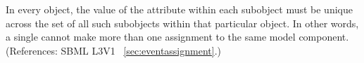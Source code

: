 In every \Event object, the value of the attribute  within
each \EventAssignment subobject must be unique across the set of all such
\EventAssignment subobjects within that particular \Event object.  In other
words, a single \Event cannot make more than one assignment to the same
model component.  (References: SBML L3V1 ~\ref{sec:eventassignment}.)
